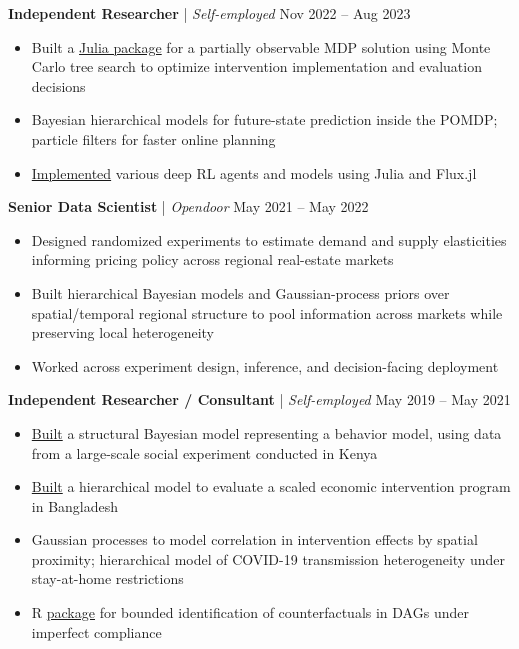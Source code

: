 \documentclass[11pt]{article}
\begin{document}
\medskip

\textbf{Independent Researcher} | \textit{Self-employed} \hfill Nov 2022 -- Aug 2023
\begin{itemize}
  \item Built a \href{https://www.github.com/karimn/FundingPOMDPs.jl}{Julia package} for a partially observable MDP solution using Monte Carlo tree search to optimize intervention implementation and evaluation decisions
  \item Bayesian hierarchical models for future-state prediction inside the POMDP; particle filters for faster online planning
  \item \href{https://github.com/karimn/grokking-drl}{Implemented} various deep RL agents and models using Julia and Flux.jl
\end{itemize}

\medskip

\textbf{Senior Data Scientist} | \textit{Opendoor} \hfill May 2021 -- May 2022
\begin{itemize}
  \item Designed randomized experiments to estimate demand and supply elasticities informing pricing policy across regional real-estate markets
  \item Built hierarchical Bayesian models and Gaussian-process priors over spatial/temporal regional structure to pool information across markets while preserving local heterogeneity
  \item Worked across experiment design, inference, and decision-facing deployment
\end{itemize}

\medskip

\textbf{Independent Researcher / Consultant} | \textit{Self-employed} \hfill May 2019 -- May 2021
\begin{itemize}
  \item \href{https://www.github.com/karimn/takeup}{Built} a structural Bayesian model representing a behavior model, using data from a large-scale social experiment conducted in Kenya
  \item \href{https://github.com/karimn/covid-19-transmission}{Built} a hierarchical model to evaluate a scaled economic intervention program in Bangladesh
  \item Gaussian processes to model correlation in intervention effects by spatial proximity; hierarchical model of COVID-19 transmission heterogeneity under stay-at-home restrictions
  \item R \href{https://www.github.com/karimn/boundr}{package} for bounded identification of counterfactuals in DAGs under imperfect compliance
\end{itemize}
\end{document}
